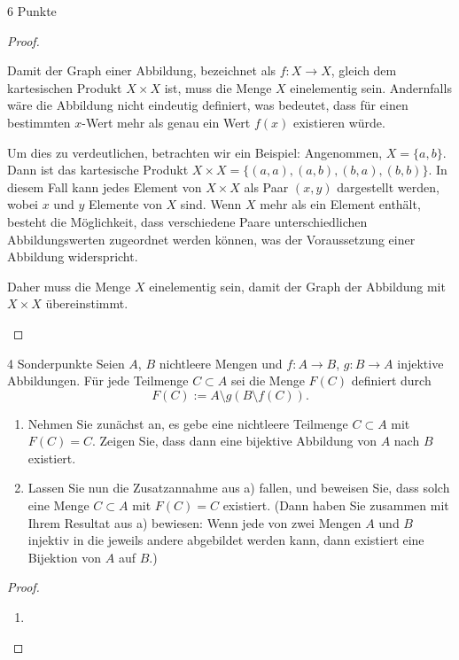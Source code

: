 \documentclass{problemset}
\begin{document}
\begin{problem}[Graphen]{6 Punkte}
\begin{proof}
\begin{enumerate}
              Damit der Graph einer Abbildung, bezeichnet als $f: X \rightarrow
              X$, gleich dem kartesischen Produkt $X \times X$ ist, muss die
              Menge $X$ einelementig sein. Andernfalls wäre die Abbildung nicht
              eindeutig definiert, was bedeutet, dass für einen bestimmten
              $x$-Wert mehr als genau ein Wert $f(x)$ existieren würde.

              Um dies zu verdeutlichen, betrachten wir ein Beispiel:
              Angenommen, $X = \{a, b\}$. Dann ist das kartesische Produkt $X
              \times X = \{(a, a), (a, b), (b, a), (b, b)\}$. In diesem Fall
              kann jedes Element von $X \times X$ als Paar $(x, y)$ dargestellt
              werden, wobei $x$ und $y$ Elemente von $X$ sind. Wenn $X$ mehr
              als ein Element enthält, besteht die Möglichkeit, dass
              verschiedene Paare unterschiedlichen Abbildungswerten zugeordnet
              werden können, was der Voraussetzung einer Abbildung
              widerspricht.

              Daher muss die Menge $X$ einelementig sein, damit der Graph der
              Abbildung mit $X \times X$ übereinstimmt.

    \end{enumerate}
\end{proof}

\end{problem}

\pagebreak

\begin{problem}{4 Sonderpunkte}
Seien $A$, $B$ nichtleere Mengen und $f : A \to B$, $g : B \to A$ injektive Abbildungen. Für jede Teilmenge $C \subset A$ sei die Menge $F(C)$ definiert durch
\[ F(C) := A \setminus g(B \setminus f(C)). \]

\begin{enumerate}
    \item Nehmen Sie zunächst an, es gebe eine nichtleere Teilmenge $C \subset
          A$ mit $F(C) = C$. Zeigen Sie, dass dann eine bijektive Abbildung von
          $A$ nach $B$ existiert.
    \item Lassen Sie nun die Zusatzannahme aus a) fallen, und beweisen Sie,
          dass solch eine Menge $C \subset A$ mit $F(C) = C$ existiert. (Dann
          haben Sie zusammen mit Ihrem Resultat aus a) bewiesen: Wenn jede von
          zwei Mengen $A$ und $B$ injektiv in die jeweils andere abgebildet
          werden kann, dann existiert eine Bijektion von $A$ auf $B$.)
\end{enumerate}

\begin{proof}
    \begin{enumerate}
        \item
    \end{enumerate}
\end{proof}
\end{problem}
\end{document}
